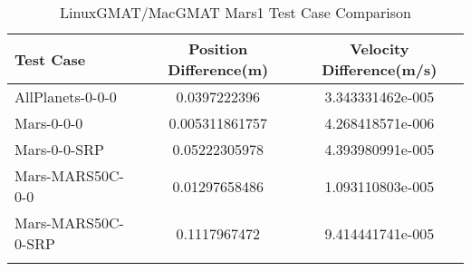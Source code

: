\begin{table}[htbp!]
\centering
\caption{ LinuxGMAT/MacGMAT Mars1 Test Case Comparison}
      \begin{tabular}{lcc}
      \hline\hline
          Test Case & Position Difference(m) & Velocity Difference(m/s) \\
         \hline
         AllPlanets-0-0-0 & 0.0397222396 & 3.343331462e-005 \\
         Mars-0-0-0 & 0.005311861757 & 4.268418571e-006 \\
         Mars-0-0-SRP & 0.05222305978 & 4.393980991e-005 \\
         Mars-MARS50C-0-0 & 0.01297658486 & 1.093110803e-005 \\
         Mars-MARS50C-0-SRP & 0.1117967472 & 9.414441741e-005 \\
      \hline\hline
      \label{Table: Mars1 LinuxGMAT-MacGMAT Table} 
\end{tabular}
\end{table}
